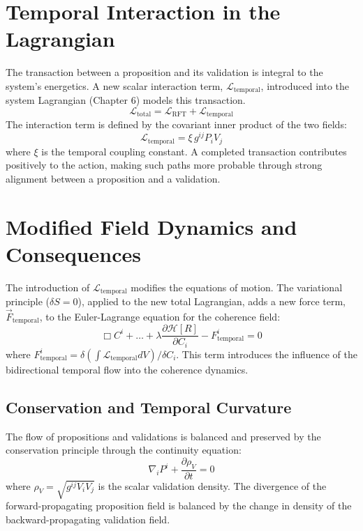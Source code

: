 \section{Temporal Interaction in the Lagrangian}

The transaction between a proposition and its validation is integral to the system's energetics. A new scalar interaction term, \(\mathcal{L}_{\text{temporal}}\), introduced into the system Lagrangian (Chapter 6) models this transaction.
\begin{equation}
\mathcal{L}_{\text{total}} = \mathcal{L}_{\text{RFT}} + \mathcal{L}_{\text{temporal}}
\end{equation}
The interaction term is defined by the covariant inner product of the two fields:
\begin{equation}
\mathcal{L}_{\text{temporal}} = \xi \, g^{ij} P_{i} V_{j}
\end{equation}
where \(\xi\) is the temporal coupling constant. A completed transaction contributes positively to the action, making such paths more probable through strong alignment between a proposition and a validation.

\section{Modified Field Dynamics and Consequences}

The introduction of \(\mathcal{L}_{\text{temporal}}\) modifies the equations of motion. The variational principle (\(\delta S = 0\)), applied to the new total Lagrangian, adds a new force term, \(\vec{F}_{\text{temporal}}\), to the Euler-Lagrange equation for the coherence field:
\begin{equation}
\Box C^i + \dots + \lambda \frac{\partial \mathcal{H}[R]}{\partial C_i} - F^i_{\text{temporal}} = 0
\end{equation}
where \(F^i_{\text{temporal}} = \delta(\int \mathcal{L}_{\text{temporal}} dV) / \delta C_i\). This term introduces the influence of the bidirectional temporal flow into the coherence dynamics.

\subsection{Conservation and Temporal Curvature}

The flow of propositions and validations is balanced and preserved by the conservation principle through the continuity equation:
\begin{equation}
\nabla_i P^i + \frac{\partial \rho_V}{\partial t} = 0
\end{equation}
where \(\rho_V = \sqrt{g^{ij} V_{i} V_{j}}\) is the scalar validation density. The divergence of the forward-propagating proposition field is balanced by the change in density of the backward-propagating validation field.

